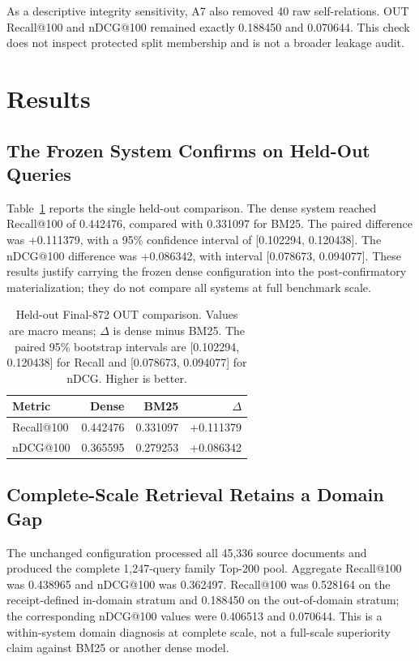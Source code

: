 \documentclass[a4paper,conference]{IEEEtran}
\begin{document}
As a descriptive integrity sensitivity, A7 also removed 40 raw self-relations.
OUT Recall@100 and nDCG@100 remained exactly 0.188450 and 0.070644. This check
does not inspect protected split membership and is not a broader leakage audit.

\section{Results}
\subsection{The Frozen System Confirms on Held-Out Queries}
Table~\ref{tab:confirm} reports the single held-out comparison. The dense system
reached Recall@100 of 0.442476, compared with 0.331097 for BM25. The paired
difference was +0.111379, with a 95\% confidence interval of [0.102294,
0.120438]. The nDCG@100 difference was +0.086342, with interval [0.078673,
0.094077]. These results justify carrying the frozen dense configuration into
the post-confirmatory materialization; they do not compare all systems at full
benchmark scale.

\begin{table}[t]
\centering
\caption{Held-out Final-872 OUT comparison. Values are macro means; $\Delta$
is dense minus BM25. The paired 95\% bootstrap intervals are [0.102294,
0.120438] for Recall and [0.078673, 0.094077] for nDCG. Higher is better.}
\label{tab:confirm}
\footnotesize
\begin{tabular}{@{}lrrr@{}}
\toprule
Metric & Dense & BM25 & $\Delta$ \\
\midrule
Recall@100 & 0.442476 & 0.331097 & +0.111379 \\
nDCG@100   & 0.365595 & 0.279253 & +0.086342 \\
\bottomrule
\end{tabular}
\end{table}

\subsection{Complete-Scale Retrieval Retains a Domain Gap}
The unchanged configuration processed all 45,336 source documents and produced
the complete 1,247-query family Top-200 pool. Aggregate Recall@100 was 0.438965
and nDCG@100 was 0.362497. Recall@100 was 0.528164 on the receipt-defined
in-domain stratum and 0.188450 on the out-of-domain stratum; the corresponding
nDCG@100 values were 0.406513 and 0.070644. This is a within-system domain
diagnosis at complete scale, not a full-scale superiority claim against BM25 or
another dense model.
\end{document}
